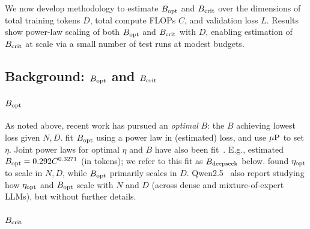 We now develop methodology to estimate $B_{\text{opt}}$ and $B_{\text{crit}}$ over the
dimensions of total training tokens $D$, total compute FLOPs $C$, and
validation loss $L$. Results show power-law scaling of both $B_{\text{opt}}$
and $B_{\text{crit}}$ with $D$, enabling estimation of $B_{\text{crit}}$ at scale via a
small number of test runs at modest budgets.

\subsection{Background: $B_{\text{opt}}$ and $B_{\text{crit}}$}\label{sec:cbs_background}

\paragraph{$B_{\text{opt}}$}

As noted above, recent work has pursued an \emph{optimal} $B$: the $B$
achieving lowest loss given $N, D$.
%
\citet{hu2024minicpm} fit $B_{\text{opt}}$ using a power law in
(estimated) loss, and use $\mbox{$\mu$P}$ to set $\eta$.
%
%
Joint power laws for optimal $\eta$ and $B$ have also been
fit~\citep{bi2024deepseek,porian2024resolving,carbonneaux2025cwm}.
E.g.,
\citet{bi2024deepseek} estimated \mbox{$B_{\text{opt}} = 0.292 C^{0.3271}$} (in tokens);
we refer to this fit as $B_{\text{deepseek}}$ below.
%
\citet{li2025predictable} found $\eta_{\text{opt}}$ to scale in $N, D$, while $B_{\text{opt}}$ primarily scales in $D$.
%
Qwen2.5~\citep{yang2024qwen2_5} also report studying how $\eta_{\text{opt}}$ and
$B_{\text{opt}}$ scale with $N$ and $D$ (across dense and mixture-of-expert
LLMs), but without further details.


\paragraph{$B_{\text{crit}}$}

